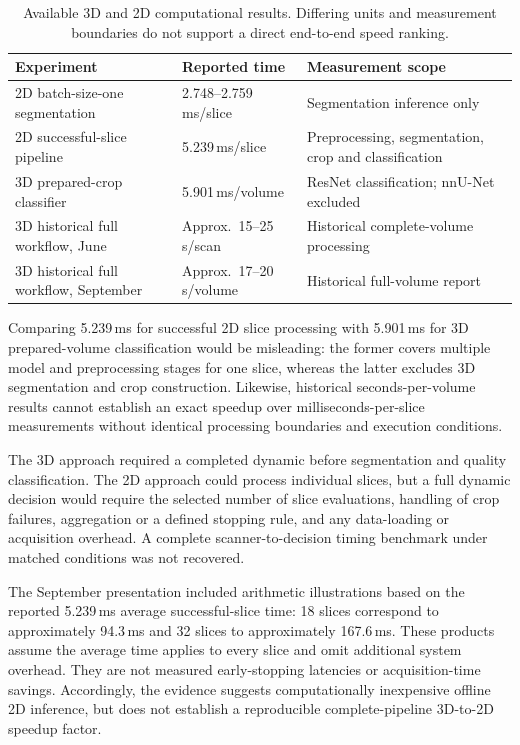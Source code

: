 \begin{table}[htbp]
\centering
\caption{Available 3D and 2D computational results. Differing units and measurement boundaries do not support a direct end-to-end speed ranking.}
\label{tab:results_runtime_scope}
\begin{tabular}{p{}p{}p{}}
\hline
Experiment & Reported time & Measurement scope \\
\hline
2D batch-size-one segmentation & 2.748--2.759\,ms/slice & Segmentation inference only \\
2D successful-slice pipeline & 5.239\,ms/slice & Preprocessing, segmentation, crop and classification \\
3D prepared-crop classifier & 5.901\,ms/volume & ResNet classification; nnU-Net excluded \\
3D historical full workflow, June & Approx.\ 15--25\,s/scan & Historical complete-volume processing \\
3D historical full workflow, September & Approx.\ 17--20\,s/volume & Historical full-volume report \\
\hline
\end{tabular}
\end{table}

Comparing 5.239\,ms for successful 2D slice processing with 5.901\,ms for 3D prepared-volume classification would be misleading: the former covers multiple model and preprocessing stages for one slice, whereas the latter excludes 3D segmentation and crop construction. Likewise, historical seconds-per-volume results cannot establish an exact speedup over milliseconds-per-slice measurements without identical processing boundaries and execution conditions.

The 3D approach required a completed dynamic before segmentation and quality classification. The 2D approach could process individual slices, but a full dynamic decision would require the selected number of slice evaluations, handling of crop failures, aggregation or a defined stopping rule, and any data-loading or acquisition overhead. A complete scanner-to-decision timing benchmark under matched conditions was not recovered.

The September presentation included arithmetic illustrations based on the reported 5.239\,ms average successful-slice time: 18 slices correspond to approximately 94.3\,ms and 32 slices to approximately 167.6\,ms. These products assume the average time applies to every slice and omit additional system overhead. They are not measured early-stopping latencies or acquisition-time savings. Accordingly, the evidence suggests computationally inexpensive offline 2D inference, but does not establish a reproducible complete-pipeline 3D-to-2D speedup factor.

